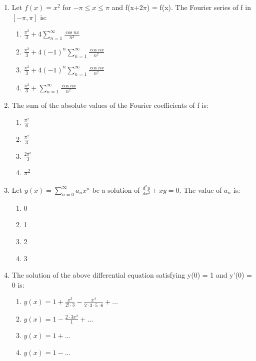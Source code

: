 \documentclass[journal,cmex10]{IEEEtran}
\theoremstyle{remark}
\numberwithin{equation}{enumi}
\numberwithin{figure}{enumi}
\begin{document}
\begin{enumerate}[label=\arabic*)]
    \item Let $f(x) = x^2$ for $-\pi \leq x \leq \pi$ and f(x+2$\pi$) = f(x). The Fourier series of f in $[-\pi,\pi]$ is:
    \bigskip
    \hfill {}
    \begin{enumerate}[label=\alph*)]
        \item $\frac{\pi^2}{3} + 4 \sum_{n=1}^{\infty} \frac{\cos nx}{n^2}$
        \vspace{0.1cm}
        \item $\frac{\pi^2}{3} + 4 (-1)^n \sum_{n=1}^{\infty} \frac{\cos nx}{n^2}$
        \vspace{0.1cm}
        \item $\frac{\pi^2}{3} + 4 (-1)^n \sum_{n=1}^{\infty} \frac{\cos nx}{n^2}$
        \vspace{0.1cm}
        \item $\frac{\pi^2}{3} + \sum_{n=1}^{\infty} \frac{\cos nx}{n^2}$
    \end{enumerate}
    \bigskip

    \item The sum of the absolute values of the Fourier coefficients of f is:
    \bigskip
    \hfill {}
    \begin{enumerate}[label=\alph*)]
        \item $\frac{\pi^2}{6}$
        \vspace{0.1cm}
        \item $\frac{\pi^2}{3}$
        \vspace{0.1cm}
        \item $\frac{2\pi^2}{3}$
        \vspace{0.1cm}
        \item $\pi^2$
    \end{enumerate}
    \bigskip

    \item Let $y(x) = \sum_{n=0}^{\infty} a_n x^n$ be a solution of $ \frac{d^2 y}{dx^2} + x y = 0$. The value of $a_n$ is:
    \bigskip
    \hfill {}
    \begin{enumerate}[label=\alph*)]
        \item 0
        \item 1
        \item 2
        \item 3
    \end{enumerate}
    \bigskip

    \item The solution of the above differential equation satisfying y(0) = 1 and y'(0) = 0 is:
    \bigskip
    \hfill {}
    \begin{enumerate}[label=\alph*)]
        \item $y(x) = 1 + \frac{x^2}{2! \cdot 3} - \frac{x^4}{2 \cdot 3 \cdot 5 \cdot 6} + \dots$
        \item  $y(x) = 1 - \frac{2 \cdot 3 x^2}{1} + \dots$
        \item $y(x) = 1 + \dots$
        \item $y(x) = 1 - \dots$
    \end{enumerate}
    \bigskip


\end{enumerate}
\end{document}
